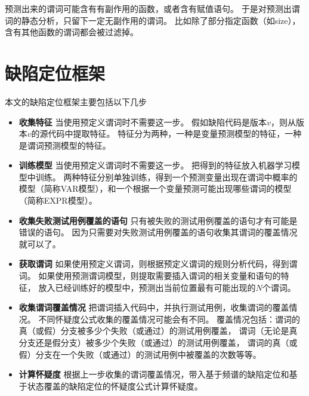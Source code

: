 预测出来的谓词可能含有有副作用的函数，或者含有赋值语句。
于是对预测出谓词的静态分析，只留下一定无副作用的谓词。
比如除了部分指定函数（如size），含有其他函数的谓词都会被过滤掉。

\section{缺陷定位框架}

本文的缺陷定位框架主要包括以下几步
\begin{itemize}
\item \textbf{收集特征} 
当使用预定义谓词时不需要这一步。
假如缺陷代码是版本$v$，则从版本$v$的源代码中提取特征。
特征分为两种，一种是变量预测模型的特征，一种是谓词预测模型的特征。
\item \textbf{训练模型}
当使用预定义谓词时不需要这一步。
把得到的特征放入机器学习模型中训练。
两种特征分别单独训练，得到一个预测变量出现在谓词中概率的模型（简称VAR模型），和一个根据一个变量预测可能出现哪些谓词的模型（简称EXPR模型）。
\item \textbf{收集失败测试用例覆盖的语句}
只有被失败的测试用例覆盖的语句才有可能是错误的语句。
因为只需要对失败测试用例覆盖的语句收集其谓词的覆盖情况就可以了。
\item \textbf{获取谓词}
如果使用预定义谓词，则根据预定义谓词的规则分析代码，得到谓词。
如果使用预测谓词模型，则提取需要插入谓词的相关变量和语句的特征，
放入已经训练好的模型中，预测出当前位置最有可能出现的$N$个谓词。
\item \textbf{收集谓词覆盖情况}
把谓词插入代码中，并执行测试用例，收集谓词的覆盖情况。
不同怀疑度公式收集的覆盖情况可能会有不同。
覆盖情况包括：谓词的真（或假）分支被多少个失败（或通过）的测试用例覆盖，
谓词（无论是真分支还是假分支）被多少个失败（或通过）的测试用例覆盖，
谓词的真（或假）分支在一个失败（或通过）的测试用例中被覆盖的次数等等。
\item \textbf{计算怀疑度}
根据上一步收集的谓词覆盖情况，带入基于频谱的缺陷定位和基于状态覆盖的缺陷定位的怀疑度公式计算怀疑度。
\end{itemize}
